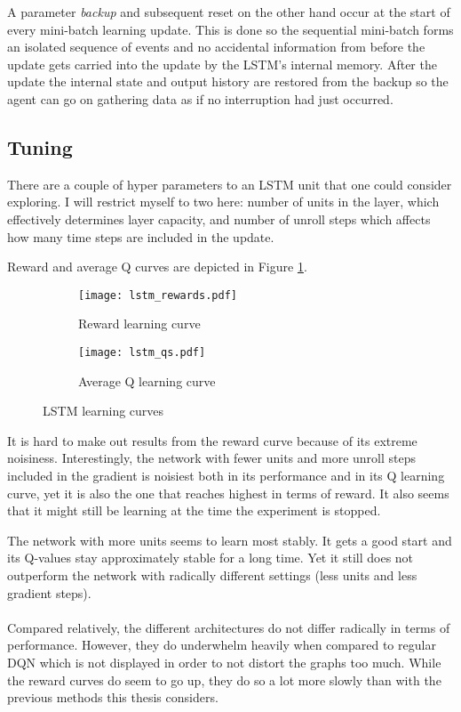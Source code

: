 A parameter \textit{backup} and subsequent reset
on the other hand
occur at the start of every mini-batch learning update.
This is done so the sequential mini-batch
forms an isolated sequence of events
and no accidental information from before the update gets carried into the update
by the LSTM's internal memory.
After the update
the internal state and output history
are restored from the backup
so the agent can go on gathering data
as if no interruption had just occurred.

\subsection{Tuning}
\label{sub:lstm_tuning}
There are a couple of hyper parameters to an LSTM unit
that one could consider exploring.
I will restrict myself to two here:
number of units in the layer,
which effectively determines layer capacity,
and number of unroll steps
which affects
how many time steps are included in the update.

Reward and average Q curves are depicted in Figure \ref{fig:lstm_both}.

\begin{figure}[htpb]
  \centering
  \begin{subfigure}[t]{.49\linewidth}
    \caption{Reward learning curve}
    \texttt{[image: lstm\_rewards.pdf]}
  \end{subfigure}
  \begin{subfigure}[t]{.49\linewidth}
    \caption{Average Q learning curve}
    \texttt{[image: lstm\_qs.pdf]}
  \end{subfigure}
  \caption{LSTM learning curves}
  \label{fig:lstm_both}
\end{figure}

It is hard to make out results from the reward curve because
of its extreme noisiness.
Interestingly,
the network with fewer units
and more unroll steps included in the gradient
is noisiest both in its performance
and in its Q learning curve,
yet it is also the one that reaches highest
in terms of reward.
It also seems that it might still be learning
at the time the experiment is stopped.

The network with more units seems to learn most stably.
It gets a good start and its Q-values stay approximately stable
for a long time.
Yet it still does not outperform
the network with radically different settings
(less units and less gradient steps).

\paragraph{}
Compared relatively,
the different architectures do not differ radically
in terms of performance.
However,
they do underwhelm heavily
when compared to regular DQN
which is not displayed in order to not distort the graphs too much.
While the reward curves do seem to go up,
they do so a lot more slowly
than with the previous methods
this thesis considers.

